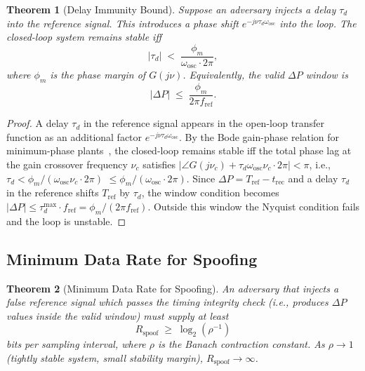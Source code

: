 \documentclass[10pt,twocolumn]{article}
\theoremstyle{plain}
\newtheorem{theorem}{Theorem}[section]
\theoremstyle{definition}
\theoremstyle{remark}
\newcommand{\DeltaP}{\Delta P}
\newcommand{\omegaosc}{\omega_{\mathrm{osc}}}
\newcommand{\Tref}{T_{\mathrm{ref}}}
\newcommand{\trec}{t_{\mathrm{rec}}}
\newcommand{\fref}{f_{\mathrm{ref}}}
\begin{document}
\begin{theorem}[Delay Immunity Bound]
\label{thm:delay}
Suppose an adversary injects a delay $\tau_d$ into the reference
signal.  This introduces a phase shift $e^{-j\nu\tau_d\omegaosc}$
into the loop.  The closed-loop system remains stable iff
\begin{equation}
  |\tau_d| \;<\; \frac{\phi_m}{\omegaosc \cdot 2\pi},
  \label{eq:delay_bound}
\end{equation}
where $\phi_m$ is the phase margin of $G(j\nu)$.  Equivalently, the
valid $\DeltaP$ window is
\begin{equation}
  |\DeltaP| \;\leq\; \frac{\phi_m}{2\pi\fref}.
  \label{eq:deltaP_window}
\end{equation}
\end{theorem}

\begin{proof}
A delay $\tau_d$ in the reference signal appears in the open-loop
transfer function as an additional factor
$e^{-j\nu\tau_d\omegaosc}$.  By the Bode gain-phase
relation for minimum-phase plants~\cite{Astrom2008}, the closed-loop
remains stable iff the total phase lag at the gain crossover frequency
$\nu_c$ satisfies
$|\angle G(j\nu_c) + \tau_d\omegaosc\nu_c \cdot 2\pi| < \pi$,
i.e., $\tau_d < \phi_m/(\omegaosc\nu_c \cdot 2\pi)$
$\leq \phi_m/(\omegaosc \cdot 2\pi)$.
Since $\DeltaP = \Tref - \trec$ and a delay $\tau_d$ in the reference
shifts $\Tref$ by $\tau_d$, the window condition becomes
$|\DeltaP| \leq \tau_d^{\max}\cdot\fref = \phi_m/(2\pi\fref)$.
Outside this window the Nyquist condition fails and the loop is
unstable.
\end{proof}

\subsection{Minimum Data Rate for Spoofing}
\label{ssec:minrate}

\begin{theorem}[Minimum Data Rate for Spoofing]
\label{thm:spoofrate}
An adversary that injects a false reference signal which passes the
timing integrity check (i.e., produces $\DeltaP$ values inside the
valid window) must supply at least
\begin{equation}
  R_{\mathrm{spoof}} \;\geq\; \log_2\!\left(\rho^{-1}\right)
  \label{eq:spoofrate}
\end{equation}
bits per sampling interval, where $\rho$ is the Banach contraction
constant.  As $\rho \to 1$ (tightly stable system, small stability
margin), $R_{\mathrm{spoof}} \to \infty$.
\end{theorem}
\end{document}
